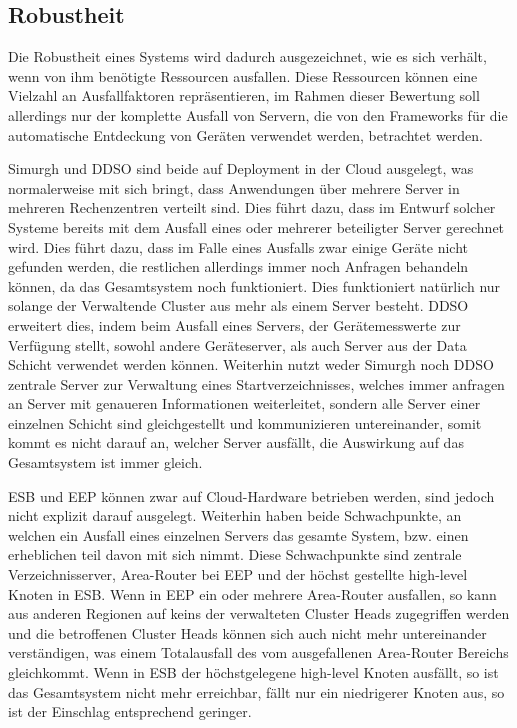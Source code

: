 \documentclass[conference,compsoc]{IEEEtran}
\begin{document}
\subsection{Robustheit}

Die Robustheit eines Systems wird dadurch ausgezeichnet, wie es sich verhält, wenn von ihm benötigte Ressourcen ausfallen. Diese Ressourcen können eine Vielzahl an Ausfallfaktoren repräsentieren, im Rahmen dieser Bewertung soll allerdings nur der komplette Ausfall von Servern, die von den Frameworks für die automatische Entdeckung von Geräten verwendet werden, betrachtet werden.

Simurgh und DDSO sind beide auf Deployment in der Cloud ausgelegt, was normalerweise mit sich bringt, dass Anwendungen über mehrere Server in mehreren Rechenzentren verteilt sind. Dies führt dazu, dass im Entwurf solcher Systeme bereits mit dem Ausfall eines oder mehrerer beteiligter Server gerechnet wird. Dies führt dazu, dass im Falle eines Ausfalls zwar einige Geräte nicht gefunden werden, die restlichen allerdings immer noch Anfragen behandeln können, da das Gesamtsystem noch funktioniert. Dies funktioniert natürlich nur solange der Verwaltende Cluster aus mehr als einem Server besteht. DDSO erweitert dies, indem beim Ausfall eines Servers, der Gerätemesswerte zur Verfügung stellt, sowohl andere Geräteserver, als auch Server aus der Data Schicht verwendet werden können. Weiterhin nutzt weder Simurgh noch DDSO zentrale Server zur Verwaltung eines Startverzeichnisses, welches immer anfragen an Server mit genaueren Informationen weiterleitet, sondern alle Server einer einzelnen Schicht sind gleichgestellt und kommunizieren untereinander, somit kommt es nicht darauf an, welcher Server ausfällt, die Auswirkung auf das Gesamtsystem ist immer gleich.

ESB und EEP können zwar auf Cloud-Hardware betrieben werden, sind jedoch nicht explizit darauf ausgelegt. Weiterhin haben beide Schwachpunkte, an welchen ein Ausfall eines einzelnen Servers das gesamte System, bzw. einen erheblichen teil davon mit sich nimmt. Diese Schwachpunkte sind zentrale Verzeichnisserver, Area-Router bei EEP und der höchst gestellte high-level Knoten in ESB. Wenn in EEP ein oder mehrere Area-Router ausfallen, so kann aus anderen Regionen auf keins der verwalteten Cluster Heads zugegriffen werden und die betroffenen Cluster Heads können sich auch nicht mehr untereinander verständigen, was einem Totalausfall des vom ausgefallenen Area-Router Bereichs gleichkommt. Wenn in ESB der höchstgelegene high-level Knoten ausfällt, so ist das Gesamtsystem nicht mehr erreichbar, fällt nur ein niedrigerer Knoten aus, so ist der Einschlag entsprechend geringer.
\end{document}
